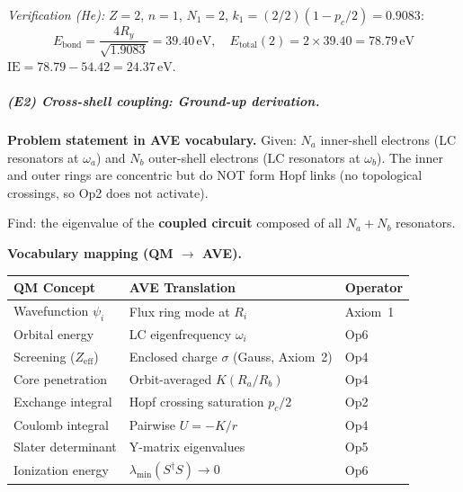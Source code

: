 \textit{Verification (He):} $Z=2$, $n=1$, $N_1 = 2$,
$k_1 = (2/2)(1 - p_c/2) = 0.9083$:
\begin{equation}
    E_{\text{bond}} = \frac{4 R_y}{\sqrt{1.9083}} = 39.40\,\text{eV},
    \quad
    E_{\text{total}}(2) = 2 \times 39.40 = 78.79\,\text{eV}
\end{equation}
$\text{IE} = 78.79 - 54.42 = 24.37\,\text{eV}$. \checkmark
\subparagraph{(E2) Cross-shell coupling: Ground-up derivation.}


\noindent\textbf{Problem statement in AVE vocabulary.}
Given: $N_a$ inner-shell electrons (LC resonators at $\omega_a$)
and $N_b$ outer-shell electrons (LC resonators at $\omega_b$).
The inner and outer rings are concentric but do NOT form
Hopf links (no topological crossings, so Op2 does not activate).

Find: the eigenvalue of the \textbf{coupled circuit}
composed of all $N_a + N_b$ resonators.

\noindent\textbf{Vocabulary mapping (QM $\to$ AVE).}
\begin{center}
\small
\renewcommand{\arraystretch}{1.2}
\begin{tabular}{lll}
\hline
\textbf{QM Concept} & \textbf{AVE Translation} & \textbf{Operator} \\
\hline
Wavefunction $\psi_i$ & Flux ring mode at $R_i$ & Axiom~1 \\
Orbital energy & LC eigenfrequency $\omega_i$ & Op6 \\
Screening ($Z_{\text{eff}}$) & Enclosed charge $\sigma$ (Gauss, Axiom~2) & Op4 \\
Core penetration & Orbit-averaged $K(R_a/R_b)$ & Op4 \\
Exchange integral & Hopf crossing saturation $p_c/2$ & Op2 \\
Coulomb integral & Pairwise $U = -K/r$ & Op4 \\
Slater determinant & Y-matrix eigenvalues & Op5 \\
Ionization energy & $\lambda_{\min}(S^\dagger S) \to 0$ & Op6 \\
\hline
\end{tabular}
\end{center}


